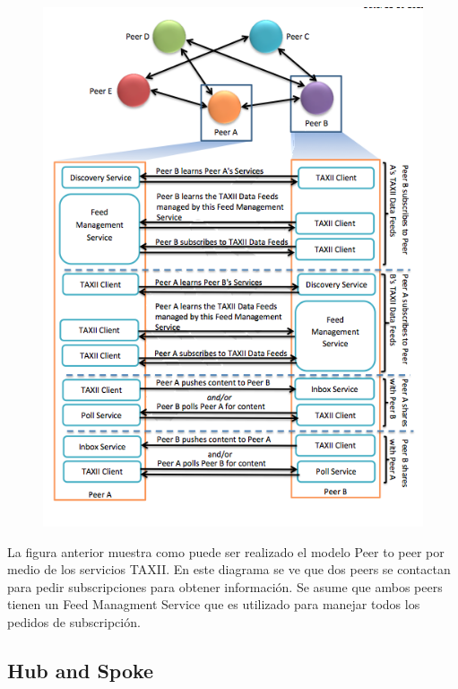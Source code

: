 \begin{figure}[ht!]
  \centering
    \includegraphics[width=150mm]{./Figures/PeerToPeerModel.png}
\end{figure}
\newpage
La figura anterior muestra como puede ser realizado el modelo Peer to peer por 
medio de los servicios TAXII. En este diagrama se ve que dos peers se contactan 
para pedir subscripciones para obtener información. Se asume que ambos peers 
tienen un Feed Managment Service que es utilizado para manejar todos los 
pedidos de subscripción.

\subsection{Hub and Spoke}

